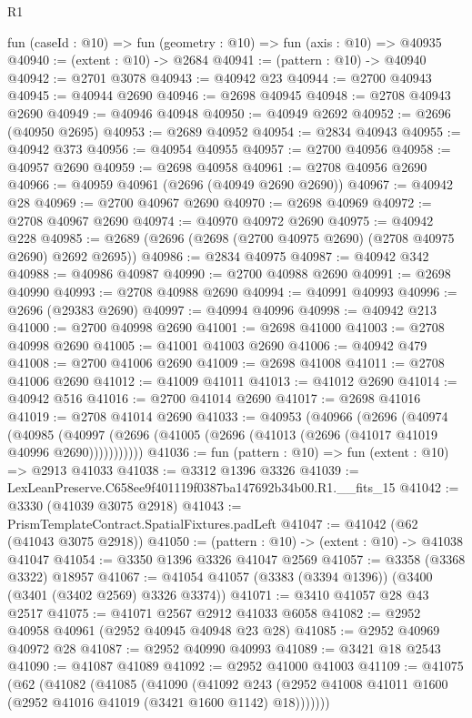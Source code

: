\begin{lexlean}{R1}
\begin{coremodule}
  fun (caseId : @10) => fun (geometry : @10) => fun (axis : @10) => @40935
@40940 := (extent : @10) -> @2684
@40941 := (pattern : @10) -> @40940
@40942 := @2701 @3078
@40943 := @40942 @23
@40944 := @2700 @40943
@40945 := @40944 @2690
@40946 := @2698 @40945
@40948 := @2708 @40943 @2690
@40949 := @40946 @40948
@40950 := @40949 @2692
@40952 := @2696 (@40950 @2695)
@40953 := @2689 @40952
@40954 := @2834 @40943
@40955 := @40942 @373
@40956 := @40954 @40955
@40957 := @2700 @40956
@40958 := @40957 @2690
@40959 := @2698 @40958
@40961 := @2708 @40956 @2690
@40966 := @40959 @40961 (@2696 (@40949 @2690 @2690))
@40967 := @40942 @28
@40969 := @2700 @40967 @2690
@40970 := @2698 @40969
@40972 := @2708 @40967 @2690
@40974 := @40970 @40972 @2690
@40975 := @40942 @228
@40985 := @2689 (@2696 (@2698 (@2700 @40975 @2690) (@2708 @40975 @2690) @2692 @2695))
@40986 := @2834 @40975
@40987 := @40942 @342
@40988 := @40986 @40987
@40990 := @2700 @40988 @2690
@40991 := @2698 @40990
@40993 := @2708 @40988 @2690
@40994 := @40991 @40993
@40996 := @2696 (@29383 @2690)
@40997 := @40994 @40996
@40998 := @40942 @213
@41000 := @2700 @40998 @2690
@41001 := @2698 @41000
@41003 := @2708 @40998 @2690
@41005 := @41001 @41003 @2690
@41006 := @40942 @479
@41008 := @2700 @41006 @2690
@41009 := @2698 @41008
@41011 := @2708 @41006 @2690
@41012 := @41009 @41011
@41013 := @41012 @2690
@41014 := @40942 @516
@41016 := @2700 @41014 @2690
@41017 := @2698 @41016
@41019 := @2708 @41014 @2690
@41033 := @40953
    (@40966
      (@2696
        (@40974
          (@40985
            (@40997 (@2696 (@41005 (@2696 (@41013 (@2696 (@41017 @41019 @40996 @2690)))))))))))
@41036 := fun (pattern : @10) => fun (extent : @10) => @2913 @41033
@41038 := @3312 @1396 @3326
@41039 := LexLeanPreserve.C658ee9f401119f0387ba147692b34b00.R1.__fits_15
@41042 := @3330 (@41039 @3075 @2918)
@41043 := PrismTemplateContract.SpatialFixtures.padLeft
@41047 := @41042 (@62 (@41043 @3075 @2918))
@41050 := (pattern : @10) -> (extent : @10) -> @41038 @41047
@41054 := @3350 @1396 @3326 @41047 @2569
@41057 := @3358 (@3368 @3322) @18957
@41067 := @41054 @41057 (@3383 (@3394 @1396)) (@3400 (@3401 (@3402 @2569) @3326 @3374))
@41071 := @3410 @41057 @28 @43 @2517
@41075 := @41071 @2567 @2912 @41033 @6058
@41082 := @2952 @40958 @40961 (@2952 @40945 @40948 @23 @28)
@41085 := @2952 @40969 @40972 @28
@41087 := @2952 @40990 @40993
@41089 := @3421 @18 @2543
@41090 := @41087 @41089
@41092 := @2952 @41000 @41003
@41109 := @41075
    (@62
      (@41082
        (@41085
          (@41090
            (@41092
              @243
              (@2952 @41008 @41011 @1600 (@2952 @41016 @41019 (@3421 @1600 @1142) @18)))))))

\end{coremodule}
\end{lexlean}
